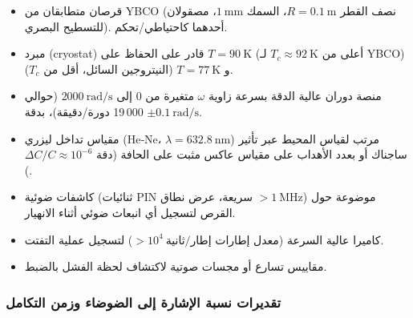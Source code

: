 \documentclass[12pt,a4paper]{article}
\begin{document}
	\begin{itemize}
		\item قرصان متطابقان من YBCO (نصف القطر \(R = 0.1\ \text{m}\)، السمك \(1\ \text{mm}\)، مصقولان للتسطيح البصري). أحدهما كاحتياطي/تحكم.
		\item مبرد (cryostat) قادر على الحفاظ على \(T = 90\ \text{K}\) (أعلى من \(T_c \approx 92\ \text{K}\) لـ YBCO) و \(T = 77\ \text{K}\) (النيتروجين السائل، أقل من \(T_c\)).
		\item منصة دوران عالية الدقة بسرعة زاوية \(\omega\) متغيرة من 0 إلى \(2000\ \text{rad/s}\) (حوالي 19 000 دورة/دقيقة)، بدقة \(\pm 0.1\ \text{rad/s}\).
		\item مقياس تداخل ليزري (He‑Ne، \(\lambda = 632.8\ \text{nm}\)) مرتب لقياس المحيط عبر تأثير ساجناك أو بعدد الأهداب على مقياس عاكس مثبت على الحافة (دقة \(\Delta C/C \approx 10^{-6}\)).
		\item كاشفات ضوئية (ثنائيات PIN سريعة، عرض نطاق \(> 1\ \text{MHz}\)) موضوعة حول القرص لتسجيل أي انبعاث ضوئي أثناء الانهيار.
		\item كاميرا عالية السرعة (معدل إطارات \(> 10^4\ \text{إطار/ثانية}\)) لتسجيل عملية التفتت.
		\item مقاييس تسارع أو مجسات صوتية لاكتشاف لحظة الفشل بالضبط.
	\end{itemize}
	
	\subsubsection{تقديرات نسبة الإشارة إلى الضوضاء وزمن التكامل}
	
\end{document}
